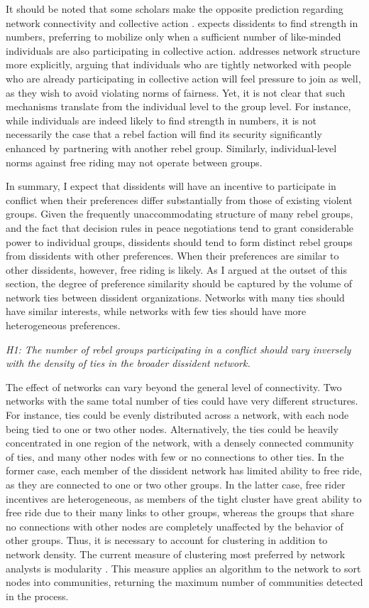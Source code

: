 It should be noted that some scholars make the opposite prediction regarding network connectivity and collective action \citep[e.g.][]{Marwell1988}. \citet{Kuran1991} expects dissidents to find strength in numbers, preferring to mobilize only when a sufficient number of like-minded individuals are also participating in collective action. \citet{Gould1993} addresses network structure more explicitly, arguing that individuals who are tightly networked with people who are already participating in collective action will feel pressure to join as well, as they wish to avoid violating norms of fairness. Yet, it is not clear that such mechanisms translate from the individual level to the group level. For instance, while individuals are indeed likely to find strength in numbers, it is not necessarily the case that a rebel faction will find its security significantly enhanced by partnering with another rebel group. Similarly, individual-level norms against free riding \citep{Gould1993} may not operate between groups.

In summary, I expect that dissidents will have an incentive to participate in conflict when their preferences differ substantially from those of existing violent groups. Given the frequently unaccommodating structure of many rebel groups, and the fact that decision rules in peace negotiations tend to grant considerable power to individual groups, dissidents should tend to form distinct rebel groups from dissidents with other preferences. When their preferences are similar to other dissidents, however, free riding is likely. As I argued at the outset of this section, the degree of preference similarity should be captured by the volume of network ties between dissident organizations. Networks with many ties should have similar interests, while networks with few ties should have more heterogeneous preferences.

\noindent \textit{H1: The number of rebel groups participating in a conflict should vary inversely with the density of ties in the broader dissident network.}

The effect of networks can vary beyond the general level of connectivity. Two networks with the same total number of ties could have very different structures. For instance, ties could be evenly distributed across a network, with each node being tied to one or two other nodes. Alternatively, the ties could be heavily concentrated in one region of the network, with a densely connected community of ties, and many other nodes with few or no connections to other ties. In the former case, each member of the dissident network has limited ability to free ride, as they are connected to one or two other groups. In the latter case, free rider incentives are heterogeneous, as members of the tight cluster have great ability to free ride due to their many links to other groups, whereas the groups that share no connections with other nodes are completely unaffected by the behavior of other groups. Thus, it is necessary to account for clustering in addition to network density. The current measure of clustering most preferred by network analysts is modularity \citep{Newman2004a}. This measure applies an algorithm to the network to sort nodes into communities, returning the maximum number of communities detected in the process.

